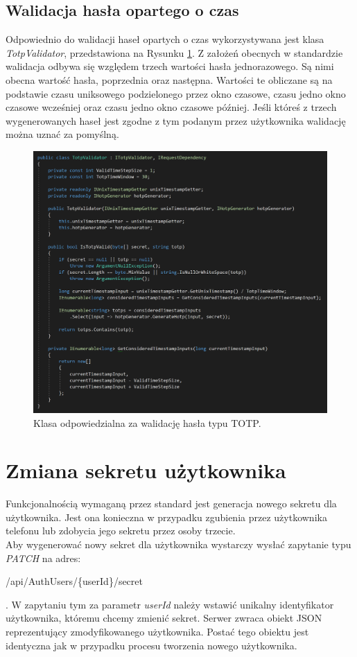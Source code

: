 \subsection{Walidacja hasła opartego o czas}
Odpowiednio do walidacji haseł opartych o czas wykorzystywana jest klasa \textit{TotpValidator}, 
przedstawiona na Rysunku \ref{totp-validator}.
Z założeń obecnych w standardzie walidacja odbywa się względem trzech wartości hasła jednorazowego.
Są nimi obecna wartość hasła, poprzednia oraz następna. 
Wartości te obliczane są na podstawie czasu uniksowego podzielonego przez okno czasowe, 
czasu jedno okno czasowe wcześniej oraz czasu jedno okno czasowe później. 
Jeśli któreś z trzech wygenerowanych haseł jest zgodne z tym podanym przez użytkownika walidację można uznać za pomyślną.
\begin{figure}[t]
    \centering
	\includegraphics[width=\textwidth]{content/images/code-tvalidator}
    \caption{Klasa odpowiedzialna za walidację hasła typu TOTP.}
    \label{totp-validator}
\end{figure}

\section{Zmiana sekretu użytkownika}
Funkcjonalnością wymaganą przez standard jest generacja nowego sekretu dla użytkownika.
Jest ona konieczna w przypadku zgubienia przez użytkownika telefonu lub zdobycia jego sekretu przez osoby trzecie. \\
Aby wygenerować nowy sekret dla użytkownika wystarczy wysłać zapytanie typu \textit{PATCH} na adres: \\
\centerline{/api/AuthUsers/\{userId\}/secret}.
W zapytaniu tym za parametr \textit{userId} należy wstawić unikalny identyfikator użytkownika, któremu chcemy zmienić sekret.
Serwer zwraca obiekt JSON reprezentujący zmodyfikowanego użytkownika. 
Postać tego obiektu jest identyczna jak w przypadku procesu tworzenia nowego użytkownika.

